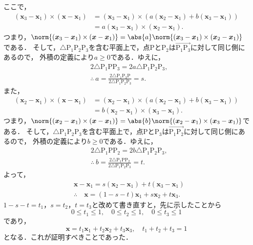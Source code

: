 \begin{tproof}
  ここで，
  \begin{align*}
    (\bm{x}_3 - \bm{x}_1) \times (\bm{x}-\bm{x}_1) & =  (\bm{x}_3 - \bm{x}_1) \times (a(\bm{x}_2 - \bm{x}_1) + b(\bm{x}_3 - \bm{x}_1)) \\
                                                   & = a (\bm{x}_3- \bm{x}_1) \times (\bm{x}_2 - \bm{x}_1).
  \end{align*}
  つまり，$\norm{(\bm{x}_3 - \bm{x}_1) \times (\bm{x}-\bm{x}_1)} = \abs{a} \norm{(\bm{x}_3- \bm{x}_1) \times (\bm{x}_2 - \bm{x}_1)}$である．
  そして，$\triangle{\mathrm{P}_1 \mathrm{P}_2 \mathrm{P}_3}$を含む平面上で，点$\mathrm{P}$と$\mathrm{P}_2$は$\overrightarrow{\mathrm{P_1 P_3}}$に対して同じ側にあるので，
  外積の定義により$a \ge 0$である．ゆえに，
  \begin{align*}
     & 2 \triangle{\mathrm{P}_1 \mathrm{P} \mathrm{P}_3} = 2 a \triangle{\mathrm{P}_1 \mathrm{P}_2 \mathrm{P}_3},                         \\
     & \therefore ~a = \frac{2 \triangle{\mathrm{P}_1 \mathrm{P}_3 \mathrm{P}}} {2 \triangle{\mathrm{P}_1 \mathrm{P}_2 \mathrm{P}_3}}= s.
  \end{align*}
  また，
  \begin{align*}
    (\bm{x}_2 - \bm{x}_1) \times (\bm{x}-\bm{x}_1) & =  (\bm{x}_2 - \bm{x}_1) \times (a(\bm{x}_2 - \bm{x}_1) + b(\bm{x}_3 - \bm{x}_1)) \\
                                                   & = b (\bm{x}_2- \bm{x}_1) \times (\bm{x}_3 - \bm{x}_1).
  \end{align*}
  つまり，$\norm{(\bm{x}_2 - \bm{x}_1) \times (\bm{x}-\bm{x}_1)} = \abs{b} \norm{(\bm{x}_2- \bm{x}_1) \times (\bm{x}_3 - \bm{x}_1)}$である．
  そして，$ \triangle{\mathrm{P}_1 \mathrm{P}_2 \mathrm{P}_3}$を含む平面上で，点$\mathrm{P}$と$\mathrm{P}_3$は$\overrightarrow{\mathrm{P_1 P_2}}$に対して同じ側にあるので，
  外積の定義により$ b \ge 0$である．ゆえに，
  \begin{align*}
     & 2 \triangle{\mathrm{P}_1 \mathrm{P} \mathrm{P}_2} = 2 b \triangle{\mathrm{P}_1 \mathrm{P}_2 \mathrm{P}_3},                         \\
     & \therefore ~b = \frac{2 \triangle{\mathrm{P}_1 \mathrm{P} \mathrm{P}_2} }{2 \triangle{\mathrm{P}_1 \mathrm{P}_2 \mathrm{P}_3}}= t.
  \end{align*}
  よって，
  \begin{align*}
     & \bm{x} - \bm{x}_1 = s(\bm{x}_2 - \bm{x}_1) + t(\bm{x}_3 - \bm{x}_1) \\
     & \therefore \quad \bm{x} = (1-s-t)\bm{x}_1 + s\bm{x}_2 + t\bm{x}_3.
  \end{align*}
  $1-s-t=t_1 $，$s=t_2$，$t=t_3$と改めて書き直すと，先に示したことから
  \[
    0 \le t_1 \le 1 ,\quad 0 \le t_2 \le 1 ,\quad 0 \le t_3 \le 1
  \]
  であり，
  \[
    \bm{x} = t_1\bm{x}_1 + t_2\bm{x}_2 + t_3 \bm{x}_3,\quad t_1+t_2+t_3=1
  \]
  となる．これが証明すべきことであった．
\end{tproof}
%

